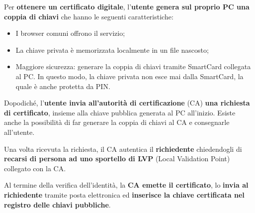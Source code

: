 \documentclass[a4paper]{article}
\begin{document}
	Per \textcolor{Red3}{\textbf{ottenere un certificato digitale}}, l'\textbf{utente genera sul proprio PC una coppia di chiavi} che hanno le seguenti caratteristiche:
	\begin{itemize}
		\item I browser comuni offrono il servizio;
		
		\item La chiave privata è memorizzata localmente in un file nascosto;
		
		\item Maggiore sicurezza: generare la coppia di chiavi tramite SmartCard collegata al PC. In questo modo, la chiave privata non esce mai dalla SmartCard, la quale è anche protetta da PIN.
	\end{itemize}
	Dopodiché, l'\textbf{utente invia all'autorità di certificazione} (CA) \textbf{una richiesta di certificato}, insieme alla chiave pubblica generata al PC all'inizio. Esiste anche la possibilità di far generare la coppia di chiavi al CA e consegnarle all'utente.\newline
	
	\noindent
	Una volta ricevuta la richiesta, il CA autentica il \textbf{richiedente} chiedendogli di \textbf{recarsi di persona ad uno sportello di LVP} (Local Validation Point) collegato con la CA.\newline
	
	\noindent
	Al termine della verifica dell'identità, la \textbf{CA emette il certificato}, lo \textbf{invia al richiedente} tramite posta elettronica ed \textbf{inserisce la chiave certificata nel registro delle chiavi pubbliche}.\newline
	
\end{document}
